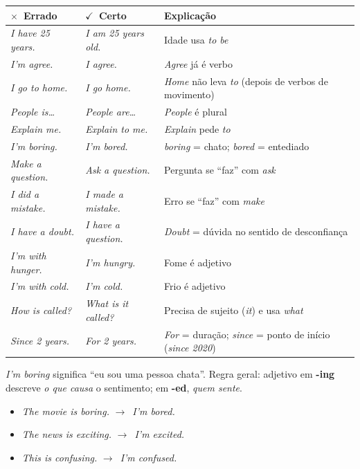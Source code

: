 \documentclass[12pt,a4paper,oneside]{book}
\newcommand{\en}[1]{\textit{#1}}                 %
\newcommand{\ok}{\textcolor{green!45!black}{$\checkmark$}}
\newcommand{\no}{\textcolor{red!70!black}{$\times$}}
\newcommand{\ra}{$\rightarrow$}
\begin{document}
\begin{center}
\begin{tabularx}{\textwidth}{@{}p{3.6cm}p{3.6cm}X@{}}
\toprule
\textbf{\no\ Errado} & \textbf{\ok\ Certo} & \textbf{Explicação} \\
\midrule
\en{I have 25 years.} & \en{I am 25 years old.} & Idade usa \en{to be} \\
\en{I'm agree.} & \en{I agree.} & \en{Agree} já é verbo \\
\en{I go to home.} & \en{I go home.} & \en{Home} não leva \en{to} (depois de verbos de movimento) \\
\en{People is\ldots} & \en{People are\ldots} & \en{People} é plural \\
\en{Explain me.} & \en{Explain to me.} & \en{Explain} pede \en{to} \\
\en{I'm boring.} & \en{I'm bored.} & \en{boring} = chato; \en{bored} = entediado \\
\en{Make a question.} & \en{Ask a question.} & Pergunta se ``faz'' com \en{ask} \\
\en{I did a mistake.} & \en{I made a mistake.} & Erro se ``faz'' com \en{make} \\
\en{I have a doubt.} & \en{I have a question.} & \en{Doubt} = dúvida no sentido de desconfiança \\
\en{I'm with hunger.} & \en{I'm hungry.} & Fome é adjetivo \\
\en{I'm with cold.} & \en{I'm cold.} & Frio é adjetivo \\
\en{How is called?} & \en{What is it called?} & Precisa de sujeito (\en{it}) e usa \en{what} \\
\en{Since 2 years.} & \en{For 2 years.} & \en{For} = duração; \en{since} = ponto de início (\en{since 2020}) \\
\bottomrule
\end{tabularx}
\end{center}

\begin{cuidado}
\en{I'm boring} significa ``eu sou uma pessoa chata''. Regra geral: adjetivo em \textbf{-ing} descreve \emph{o que causa} o sentimento; em \textbf{-ed}, \emph{quem sente}.
\begin{itemize}
  \item \en{The movie is boring.} \ra\ \en{I'm bored.}
  \item \en{The news is exciting.} \ra\ \en{I'm excited.}
  \item \en{This is confusing.} \ra\ \en{I'm confused.}
\end{itemize}
\end{cuidado}
\end{document}
